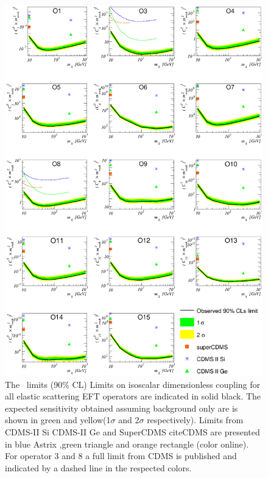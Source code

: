 \begin{figure}
\begin{minipage}{1.\linewidth}{}
\centerline{\includegraphics[width=\textwidth,height=\textheight,keepaspectratio]{Figures/ElasticAllLimitCDMS.eps}}
\end{minipage}
\caption{The \Xehund\ limits (90\% CL) Limits on isoscalar dimensionless coupling for all elastic scattering EFT operators are indicated in solid black. The expected sensitivity obtained assuming background only are is shown in green and yellow(1$\sigma$ and 2$\sigma$ respectively). Limits from CDMS-II Si CDMS-II Ge and SuperCDMS cite{CDMS} are presented in blue Astrix ,green triangle and orange rectangle (color online). For operator 3 and 8 a full limit from CDMS is published and indicated by a dashed line in the respected colors.}
\label{fig:elasticLimit}
\end{figure}



